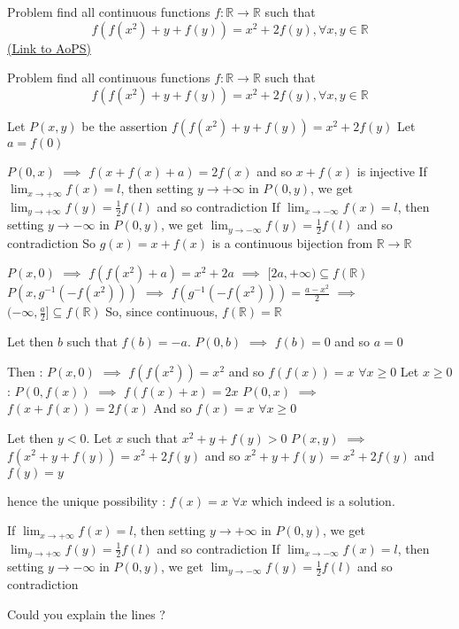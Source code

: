 \begin{problem}
	Problem find all continuous functions $f:\mathbb{R}\to\mathbb{R}$ such that 
\[f(f(x^2)+y+f(y))=x^2+2f(y),\forall x,y\in\mathbb{R}\]
	\flushright \href{https://artofproblemsolving.com/community/c6h529496}{(Link to AoPS)}
\end{problem}



\begin{solution}
	\begin{tcolorbox}Problem find all continuous functions $f:\mathbb{R}\to\mathbb{R}$ such that 
\[f(f(x^2)+y+f(y))=x^2+2f(y),\forall x,y\in\mathbb{R}\]\end{tcolorbox}
Let $P(x,y)$ be the assertion $f(f(x^2)+y+f(y))=x^2+2f(y)$
Let $a=f(0)$

$P(0,x)$ $\implies$ $f(x+f(x)+a)=2f(x)$ and so $x+f(x)$ is injective
If $\lim_{x\to+\infty}f(x)=l$, then setting $y\to+\infty$ in $P(0,y)$, we get $\lim_{y\to+\infty}f(y)=\frac 12f(l)$ and so contradiction
If $\lim_{x\to-\infty}f(x)=l$, then setting $y\to-\infty$ in $P(0,y)$, we get $\lim_{y\to-\infty}f(y)=\frac 12f(l)$ and so contradiction
So $g(x)=x+f(x)$ is a continuous bijection from $\mathbb R\to\mathbb R$

$P(x,0)$ $\implies$ $f(f(x^2)+a)=x^2+2a$ $\implies$ $[2a,+\infty)\subseteq f(\mathbb R)$
$P(x,g^{-1}(-f(x^2)))$ $\implies$ $f(g^{-1}(-f(x^2)))=\frac{a-x^2}2$ $\implies$ $(-\infty,\frac a2]\subseteq f(\mathbb R)$
So, since continuous, $f(\mathbb R)=\mathbb R$

Let then $b$ such that $f(b)=-a$. $P(0,b)$ $\implies$ $f(b)=0$ and so $a=0$

Then : 
$P(x,0)$ $\implies$ $f(f(x^2))=x^2$ and so $f(f(x))=x$ $\forall x\ge 0$
Let $x\ge 0$ : 
$P(0,f(x))$ $\implies$ $f(f(x)+x)=2x$
$P(0,x)$ $\implies$ $f(x+f(x))=2f(x)$
And so $f(x)=x$ $\forall x\ge 0$

Let then $y<0$. Let $x$ such that $x^2+y+f(y)>0$
$P(x,y)$ $\implies$ $f(x^2+y+f(y))=x^2+2f(y)$ and so $x^2+y+f(y)=x^2+2f(y)$ and $f(y)=y$

hence the unique possibility : $\boxed{f(x)=x}$ $\forall x$ which indeed is a solution.
\end{solution}



\begin{solution}
	\begin{tcolorbox}
If $\lim_{x\to+\infty}f(x)=l$, then setting $y\to+\infty$ in $P(0,y)$, we get $\lim_{y\to+\infty}f(y)=\frac 12f(l)$ and so contradiction
If $\lim_{x\to-\infty}f(x)=l$, then setting $y\to-\infty$ in $P(0,y)$, we get $\lim_{y\to-\infty}f(y)=\frac 12f(l)$ and so contradiction

\end{tcolorbox}
Could you explain the lines ?
\end{solution}



